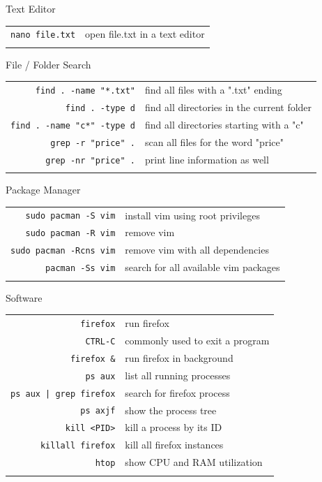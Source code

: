 \documentclass[14pt]{article}
\newcommand{\lc}[2]{\texttt{#1} & #2\tabularnewline\rule{0pt}{0.5cm}}
\begin{document}
\def\mytitle{Terminal Basics II} %

\fancyhead[C]{\fontsize{25}{15} \selectfont \mytitle}


\begin{multicols*}{2}

    \begin{mybox}{Text Editor}
        \begin{tabular}{rl}
            \lc{nano file.txt}{open file.txt in a text editor}
        \end{tabular}
    \end{mybox}
    \begin{mybox}{File / Folder Search}
        \begin{tabular}{rl}
            \lc{find .\ -name "*.txt"}{find all files with a ".txt" ending}
            \lc{find .\ -type d}{find all directories in the current folder}
            \lc{find .\ -name "c*" -type d}{find all directories starting with a "c"}
            \lc{grep -r "price" .}{scan all files for the word "price"}
            \lc{grep -nr "price" .}{print line information as well}
        \end{tabular}
    \end{mybox}
    \begin{mybox}{Package Manager}
        \begin{tabular}{rl}
            \lc{sudo pacman -S vim}{install vim using root privileges}
            \lc{sudo pacman -R vim}{remove vim}
            \lc{sudo pacman -Rcns vim}{remove vim with all dependencies}
            \lc{pacman -Ss vim}{search for all available vim packages}
        \end{tabular}
    \end{mybox}
    \vphantom{1em}
    \begin{mybox}{Software}
        \begin{tabular}{rl}
            \lc{firefox}{run firefox}
            \lc{CTRL-C}{commonly used to exit a program}
            \lc{firefox \&}{run firefox in background}
            \lc{ps aux}{list all running processes}
            \lc{ps aux | grep firefox}{search for firefox process}
            \lc{ps axjf}{show the process tree}
            \lc{kill <PID>}{kill a process by its ID}
            \lc{killall firefox}{kill all firefox instances}
            \lc{htop}{show CPU and RAM utilization}
        \end{tabular}
    \end{mybox}
    

\end{multicols*}
\end{document}
